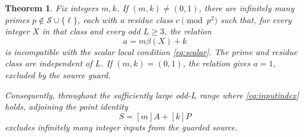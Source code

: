 \documentclass[11pt,a4paper]{article}
\newtheorem{theorem}{Theorem}[section]
\begin{document}
\begin{theorem}\label{thm:affine}
Fix integers $m,k$. If $(m,k)\ne(0,1)$, there are infinitely many primes
$p\notin\mathcal S\cup\{\ell\}$, each with a residue class
$c\pmod{p^2}$ such that, for every integer $X$ in that class and
every odd $L\ge3$, the relation
\begin{equation}\label{eq:affinelabel}
                              a=m\beta(X)+k
\end{equation}
is incompatible with the scalar local condition
\eqref{eq:scalar}. The prime and residue class are independent of
$L$. If $(m,k)=(0,1)$, the relation gives $a=1$, excluded by the
source guard.

Consequently, throughout the sufficiently large odd-$L$ range
where \eqref{eq:inputindex} holds, adjoining the point identity
\begin{equation}\label{eq:pointidentity}
                              S=[m]A+[k]P
\end{equation}
excludes infinitely many integer inputs from the guarded source.
\end{theorem}
\end{document}
